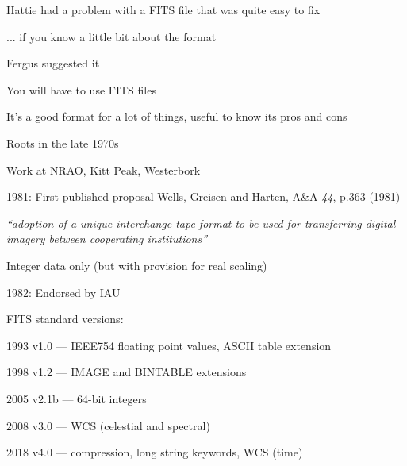 \documentclass[20pt,landscape]{foils}
\newcommand{\bhref}[2]{\href{#1}{{\color{blue}#2}}}
\begin{document}

\begin{list1}
  \item Hattie had a problem with a FITS file that was quite easy to fix
  \begin{list2big}
    \item[] ... if you know a little bit about the format
  \end{list2big}
  \item Fergus suggested it
  \item You will have to use FITS files
  \item It's a good format for a lot of things,
        useful to know its pros and cons
\end{list1}



\begin{list1}
  \item Roots in the late 1970s
  \begin{list2big}
    \item Work at NRAO, Kitt Peak, Westerbork
  \end{list2big}
  \item 1981: First published proposal
        \bhref{https://ui.adsabs.harvard.edu/abs/1981A&AS...44..363W}
              {Wells, Greisen and Harten, A{\&}A {\sl 44}, p.363 (1981)}
  \begin{list2big}
    \item {\sl
           ``adoption of a unique interchange tape format to be used for
             transferring digital imagery between cooperating institutions''}
    \item Integer data only (but with provision for real scaling)
  \end{list2big}
  \item 1982: Endorsed by IAU
  \item FITS standard versions:
  \begin{list2big}
     \item[1993] v1.0 --- IEEE754 floating point values, ASCII table extension
     \item[1998] v1.2 --- IMAGE and BINTABLE extensions
     \item[2005] v2.1b --- 64-bit integers
     \item[2008] v3.0 --- WCS (celestial and spectral)
     \item[2018] v4.0 --- compression, long string keywords, WCS (time)
  \end{list2big}
\end{list1}
\end{document}
